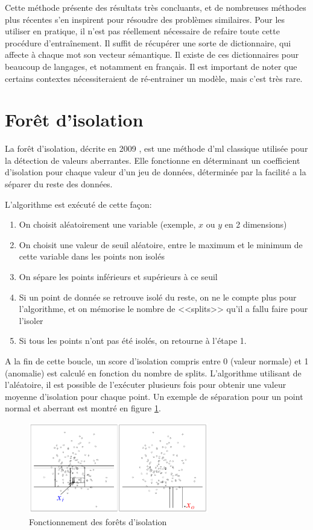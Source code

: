 \documentclass[openany, 11pt]{memoir}
\begin{document}
Cette méthode présente des résultats très concluants, et de nombreuses méthodes plus récentes s'en inspirent pour résoudre des problèmes similaires. Pour les utiliser en pratique, il n'est pas réellement nécessaire de refaire toute cette procédure d'entraînement. Il suffit de récupérer une sorte de dictionnaire, qui affecte à chaque mot son vecteur sémantique. Il existe de ces dictionnaires pour beaucoup de langages, et notamment en français. Il est important de noter que certains contextes nécessiteraient de ré-entrainer un modèle, mais c'est très rare.

\section{Forêt d'isolation}

La forêt d'isolation, décrite en 2009 \cite{isolationforest}, est une méthode d'\gls{ml} classique utilisée pour la détection de valeurs aberrantes. Elle fonctionne en déterminant un coefficient d'isolation pour chaque valeur d'un jeu de données, déterminée par la facilité a la séparer du reste des données.

L'algorithme est exécuté de cette façon:

\begin{enumerate}
	\item On choisit aléatoirement une variable (exemple, $x$ ou $y$ en 2 dimensions)
	\item On choisit une valeur de seuil aléatoire, entre le maximum et le minimum de cette variable dans les points non isolés
	\item On sépare les points inférieurs et supérieurs à ce seuil
	\item Si un point de donnée se retrouve isolé du reste, on ne le compte plus pour l'algorithme, et on mémorise le nombre de <<splits>> qu'il a fallu faire pour l'isoler
	\item Si tous les points n'ont pas été isolés, on retourne à l'étape 1.
\end{enumerate}

A la fin de cette boucle, un score d'isolation compris entre 0 (valeur normale) et 1 (anomalie) est calculé en fonction du nombre de splits. L'algorithme utilisant de l'aléatoire, il est possible de l'exécuter plusieurs fois pour obtenir une valeur moyenne d'isolation pour chaque point. Un exemple de séparation pour un point normal et aberrant est montré en figure \ref{isoforest}.

\begin{figure}[ht]
	\centering
	\includegraphics[width=0.7\textwidth]{images/isoforest.png}
	\caption{Fonctionnement des forêts d'isolation}
	\label{isoforest}
\end{figure}
\end{document}
